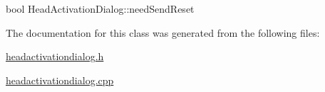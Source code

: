 \mbox{\label{classHeadActivationDialog_ab86719bd4a08237cba25753be6f831e9}} 
{\footnotesize\ttfamily bool Head\+Activation\+Dialog\+::\texorpdfstring{need\+Send\+Reset}{needSendReset}{\ttfamily [private]}}

The documentation for this class was generated from the following files\+:\begin{DoxyCompactItemize}
\item 
\mbox{\hyperlink{headactivationdialog_8h}{headactivationdialog.\+h}}\item 
\mbox{\hyperlink{headactivationdialog_8cpp}{headactivationdialog.\+cpp}}\end{DoxyCompactItemize}
\newpage
